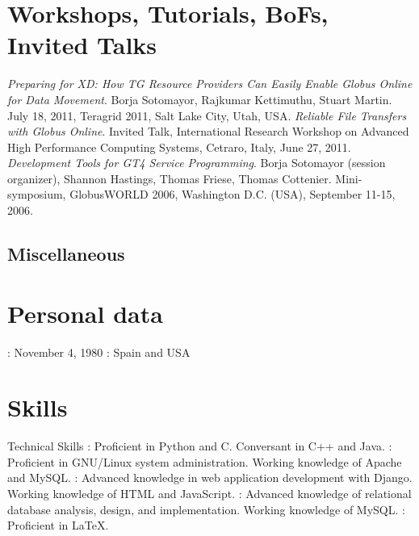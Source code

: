 \documentclass{resume}
\begin{document}
\section*{\hspace{-1cm}Workshops, Tutorials, BoFs, Invited Talks}
\begin{category}{}
\citembullet \emph{Preparing for XD: How TG Resource Providers Can Easily Enable Globus Online for Data Movement}. Borja Sotomayor, Rajkumar Kettimuthu, Stuart Martin. July 18, 2011, Teragrid 2011, Salt Lake City, Utah, USA.
\citembullet \emph{Reliable File Transfers with Globus Online}. Invited Talk, International Research Workshop on Advanced High Performance Computing Systems, Cetraro, Italy, June 27, 2011.
\citembullet \emph{Development Tools for GT4 Service Programming}. Borja Sotomayor (session organizer), Shannon Hastings, Thomas Friese, Thomas Cottenier. Mini-symposium, GlobusWORLD 2006, Washington D.C. (USA), September 11-15, 2006.
\end{category}



\pagebreak


\begin{center}
\section*{\huge Miscellaneous}
\vspace{2ex}
\end{center}

\section*{\hspace{-1cm}Personal data}
\begin{category}{}
: November 4, 1980
: Spain and USA
\end{category}

\section*{\hspace{-1cm}Skills}

\begin{category}{Technical Skills}
: Proficient in Python and C. Conversant in C++ and Java.
: Proficient in GNU/Linux system administration. Working knowledge of Apache and MySQL.
: Advanced knowledge in web application development with Django. Working knowledge of HTML and JavaScript.
: Advanced knowledge of relational database analysis, design, and implementation. Working knowledge of MySQL.
: Proficient in \LaTeX{}.
\end{category}
\end{document}
